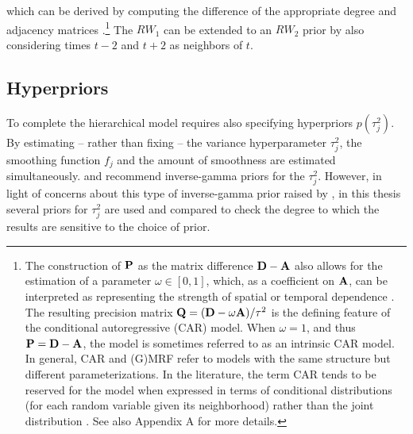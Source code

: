 \noindent which can be derived by computing the difference of the appropriate degree 
and adjacency matrices .\footnote{The construction 
of $\mathbf{P}$ as the matrix difference $\mathbf{D} - \mathbf{A}$ also allows for the estimation 
of a parameter $\omega \in [0,1]$, which, as a coefficient on $\mathbf{A}$, can be 
interpreted as representing the strength of spatial or temporal dependence 
. The resulting precision matrix 
$\mathbf{Q}= (\mathbf{D} - \omega \mathbf{A})/\tau^2$ is the defining feature of the conditional 
autoregressive (CAR) model.  When $\omega = 1$, and thus $\mathbf{P}= \mathbf{D} - \mathbf{A}$, 
the model is sometimes referred to as an intrinsic CAR model. In general, CAR and (G)MRF 
refer to models with the same structure but different parameterizations. In the literature, the 
term CAR tends to be reserved for the model when expressed in terms of conditional 
distributions (for each random variable given its neighborhood) rather than the joint distribution . 
See also Appendix A %
for more details.\label{footnote_car}} 
The $RW_1$ can be extended to an $RW_2$ prior by also considering  
times $t-2$ and $t+2$ as neighbors of $t$. 


\subsection{Hyperpriors}
\label{hyperpriors}

To complete the hierarchical model requires also specifying hyperpriors $p(\tau_j^2)$.  
By estimating -- rather than fixing -- the variance hyperparameter $\tau_j^2$, the smoothing 
function $f_j$ and the amount of smoothness are estimated simultaneously. 
 and  recommend  
inverse-gamma priors for the $\tau_j^2$. However, in light of concerns about this type 
of inverse-gamma prior raised by , in this thesis several priors 
for $\tau^2_j$ are used and compared to check the degree to which the results are 
sensitive to the choice of prior.

